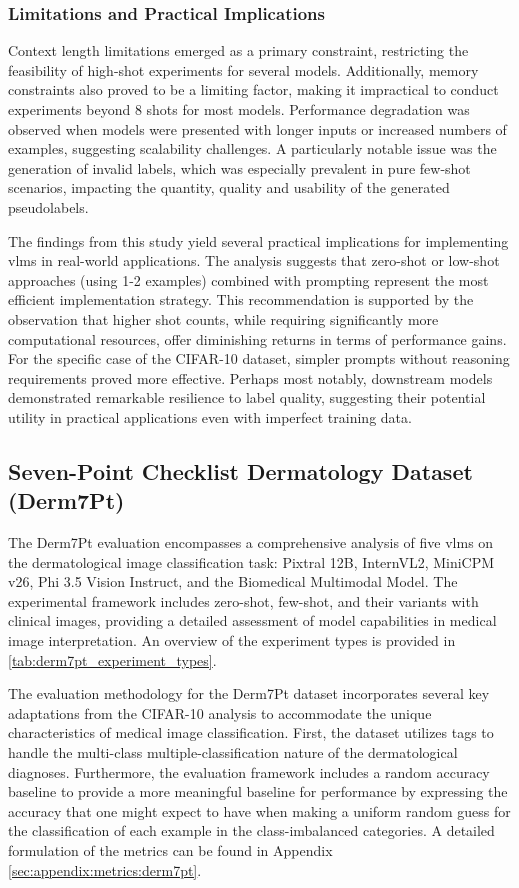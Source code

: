 \documentclass[../ShajiS_RnDReport.tex]{subfiles}
\begin{document}
\subsubsection{Limitations and Practical Implications}
Context length limitations emerged as a primary constraint, restricting the feasibility of high-shot experiments for several models. Additionally, memory constraints also proved to be a limiting factor, making it impractical to conduct experiments beyond 8 shots for most models. Performance degradation was observed when models were presented with longer inputs or increased numbers of examples, suggesting scalability challenges. A particularly notable issue was the generation of invalid labels, which was especially prevalent in pure few-shot scenarios, impacting the quantity, quality and usability of the generated pseudolabels.

The findings from this study yield several practical implications for implementing \glspl{vlm} in real-world applications. The analysis suggests that zero-shot or low-shot approaches (using 1-2 examples) combined with prompting represent the most efficient implementation strategy. This recommendation is supported by the observation that higher shot counts, while requiring significantly more computational resources, offer diminishing returns in terms of performance gains. For the specific case of the CIFAR-10 dataset, simpler prompts without reasoning requirements proved more effective. Perhaps most notably, downstream models demonstrated remarkable resilience to label quality, suggesting their potential utility in practical applications even with imperfect training data.

\subsection{Seven-Point Checklist Dermatology Dataset (Derm7Pt)}
\label{subsec:evaluation:derm7pt}
The Derm7Pt evaluation encompasses a comprehensive analysis of five \glspl{vlm} on the dermatological image classification task: Pixtral 12B, InternVL2, MiniCPM v26, Phi 3.5 Vision Instruct, and the Biomedical Multimodal Model. The experimental framework includes zero-shot, few-shot, and their variants with clinical images, providing a detailed assessment of model capabilities in medical image interpretation. An overview of the experiment types is provided in \autoref{tab:derm7pt_experiment_types}.

The evaluation methodology for the Derm7Pt dataset incorporates several key adaptations from the CIFAR-10 analysis to accommodate the unique characteristics of medical image classification. First, the dataset utilizes tags to handle the multi-class multiple-classification nature of the dermatological diagnoses. Furthermore, the evaluation framework includes a random accuracy baseline to provide a more meaningful baseline for performance by expressing the accuracy that one might expect to have when making a uniform random guess for the classification of each example in the class-imbalanced categories. A detailed formulation of the metrics can be found in Appendix \ref{sec:appendix:metrics:derm7pt}.
\end{document}
